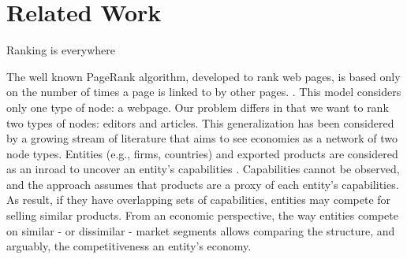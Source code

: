 \section{Related Work}


Ranking is everywhere \cite{}



The well known PageRank algorithm, developed to rank web pages, is based only on the number of times a page is linked to by other pages. \cite{page1999pagerank}. This model considers only one type of node: a webpage.  Our problem differs in that we want to rank two types of nodes: editors and articles. This generalization has been considered by a growing stream of literature that aims to see economies as a network of two node types. Entities (e.g., firms, countries) and exported products are considered as an inroad to uncover an entity's capabilities \cite{hidalgo2007}. Capabilities cannot be observed, and the approach assumes that products are a proxy of each entity's capabilities. As result, if they have overlapping sets of capabilities, entities may compete for selling similar products. From an economic perspective, the way entities compete on similar - or dissimilar - market segments allows comparing the structure, and arguably, the competitiveness an entity's economy. 


